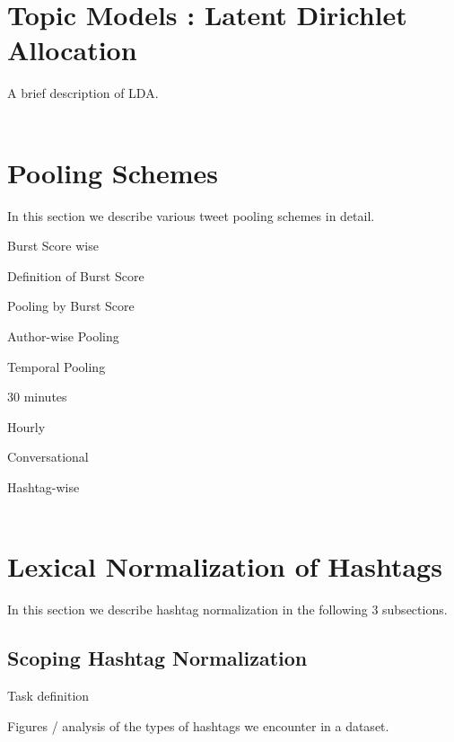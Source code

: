 \documentclass[10pt,a5paper,twoside]{article}
\begin{document}

\section{Topic Models : Latent Dirichlet Allocation}
A brief description of LDA.\\\\

\section{Pooling Schemes}
In this section we describe various tweet pooling schemes in detail.
\begin{compactenum}
\item Burst Score wise
\begin{compactitem}
\item Definition of Burst Score
\item Pooling by Burst Score
\end{compactitem}
\item Author-wise Pooling
\item Temporal Pooling
\begin{compactitem}
\item 30 minutes
\item Hourly
\end{compactitem}
\item Conversational
\item Hashtag-wise\\\\
\end{compactenum}

\section{Lexical Normalization of Hashtags}
In this section we describe hashtag normalization in the following 3 subsections.
\subsection{Scoping Hashtag Normalization}
\begin{compactitem}
\item Task definition
\item Figures / analysis of the types of hashtags we encounter in a dataset.\\
\end{compactitem}
\end{document}
